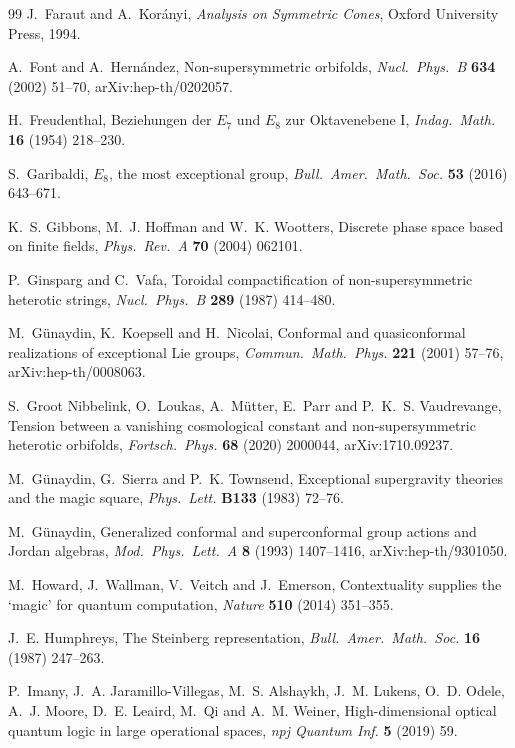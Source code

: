 \begin{thebibliography}{99}
 J.~Faraut and A.~Kor\'anyi, \emph{Analysis on Symmetric Cones},
Oxford University Press, 1994.

 A.~Font and A.~Hern\'andez, Non-supersymmetric orbifolds,
\emph{Nucl.\ Phys.\ B} \textbf{634} (2002) 51--70, arXiv:hep-th/0202057.

 H.~Freudenthal, Beziehungen der $E_7$ und $E_8$ zur Oktavenebene I,
\emph{Indag.\ Math.} \textbf{16} (1954) 218--230.

 S.~Garibaldi, $E_8$, the most exceptional group, \emph{Bull.\ Amer.\
Math.\ Soc.} \textbf{53} (2016) 643--671.

 K.~S. Gibbons, M.~J. Hoffman and W.~K. Wootters, Discrete phase space based on
finite fields, \emph{Phys.\ Rev.\ A} \textbf{70} (2004) 062101.

 P.~Ginsparg and C.~Vafa, Toroidal compactification of non-supersymmetric heterotic
strings, \emph{Nucl.\ Phys.\ B} \textbf{289} (1987) 414--480.

 M.~G\"unaydin, K.~Koepsell and H.~Nicolai, Conformal and quasiconformal
realizations of exceptional Lie groups, \emph{Commun.\ Math.\ Phys.} \textbf{221} (2001)
57--76, arXiv:hep-th/0008063.

 S.~Groot Nibbelink, O.~Loukas, A.~M\"utter, E.~Parr and P.~K.~S. Vaudrevange,
Tension between a vanishing cosmological constant and non-supersymmetric heterotic orbifolds,
\emph{Fortsch.\ Phys.} \textbf{68} (2020) 2000044, arXiv:1710.09237.

 M.~G\"unaydin, G.~Sierra and P.~K. Townsend, Exceptional supergravity
theories and the magic square, \emph{Phys.\ Lett.} \textbf{B133} (1983) 72--76.

 M.~G\"unaydin, Generalized conformal and superconformal group actions
and Jordan algebras, \emph{Mod.\ Phys.\ Lett.\ A} \textbf{8} (1993) 1407--1416,
arXiv:hep-th/9301050.

 M.~Howard, J.~Wallman, V.~Veitch and J.~Emerson, Contextuality supplies
the `magic' for quantum computation, \emph{Nature} \textbf{510} (2014) 351--355.

 J.~E. Humphreys, The Steinberg representation, \emph{Bull.\ Amer.\
Math.\ Soc.} \textbf{16} (1987) 247--263.

 P.~Imany, J.~A. Jaramillo-Villegas, M.~S. Alshaykh, J.~M. Lukens,
O.~D. Odele, A.~J. Moore, D.~E. Leaird, M.~Qi and A.~M. Weiner, High-dimensional optical
quantum logic in large operational spaces, \emph{npj Quantum Inf.} \textbf{5} (2019) 59.


\end{thebibliography}
